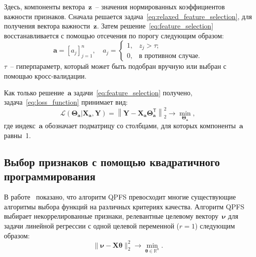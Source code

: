 \documentclass[preprint,12pt]{elsarticle}
\theoremstyle{definition}
\newcommand{\ba}{\mathbf{a}}
\newcommand{\bz}{\mathbf{z}}
\newcommand{\bY}{\mathbf{Y}}
\newcommand{\bX}{\mathbf{X}}
\newcommand{\bbR}{\mathbb{R}}
\newcommand{\T}{\mathsf{T}}
\newcommand{\bnu}{\boldsymbol{\nu}}
\newcommand{\btheta}{\boldsymbol{\theta}}
\newcommand{\bTheta}{\boldsymbol{\Theta}}
\begin{document}
Здесь, компоненты вектора~$\bz$~-- значения нормированных коэффициентов важности признаков.
Сначала решается задача~\eqref{eq:relaxed_feature_selection}, для получения вектора важности~$\bz$. 
Затем решение~\eqref{eq:feature_selection} восстанавливается с помощью отсечения по порогу следующим образом:
\begin{equation*}
\ba = [a_j]_{j=1}^n, \quad 
a_j = \begin{cases}
1, & z_j > \tau; \\
0, & \text{в противном случае}.
\end{cases}
\end{equation*}
$\tau$~-- гиперпараметр, который может быть подобран вручную или выбран с помощью кросс-валидации. 

Как только решение~$\ba$ задачи~\eqref{eq:feature_selection} получено, задача~\eqref{eq:loss_function} принимает вид:
\begin{equation*}
\mathcal{L}(\bTheta_{\ba} | \bX_{\ba}, \bY) = {\left\| \mathbf{Y} - \bX_{\ba}\bTheta^{\T}_{\ba} \right\| }_2^2 \rightarrow\min_{\bTheta_{\ba}},
\end{equation*}
где индекс~$\ba$ обозначает подматрицу со столбцами, для которых компоненты~$\ba$ равны~1.

\subsection{Выбор признаков с помощью квадратичного программирования}

В работе~\cite{katrutsa2017comprehensive} показано, что алгоритм QPFS превосходит многие существующие алгоритмы выбора функций на различных критериях качества.
Алгоритм QPFS выбирает некоррелированные признаки, релевантные целевому вектору~$\bnu$ для задачи линейной регрессии с одной целевой переменной ($r=1$) следующим образом:
\begin{equation*}
\| \bnu - \bX \btheta\|_2^2 \rightarrow\min_{\btheta \in \bbR^{n}}.
\end{equation*}
\end{document}
